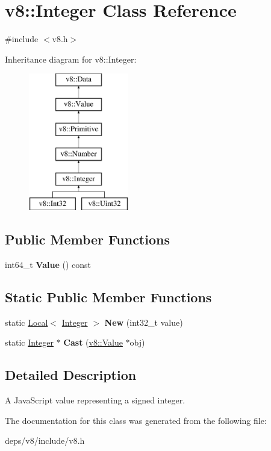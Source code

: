 \hypertarget{classv8_1_1_integer}{}\section{v8\+:\+:Integer Class Reference}
\label{classv8_1_1_integer}


{\ttfamily \#include $<$v8.\+h$>$}

Inheritance diagram for v8\+:\+:Integer\+:\begin{figure}[H]
\begin{center}
\leavevmode
\includegraphics[height=6.000000cm]{classv8_1_1_integer}
\end{center}
\end{figure}
\subsection*{Public Member Functions}
\begin{DoxyCompactItemize}
\item 
\hypertarget{classv8_1_1_integer_a93bcfb39090631a3ff95843463183c9c}{}int64\+\_\+t {\bfseries Value} () const \label{classv8_1_1_integer_a93bcfb39090631a3ff95843463183c9c}

\end{DoxyCompactItemize}
\subsection*{Static Public Member Functions}
\begin{DoxyCompactItemize}
\item 
\hypertarget{classv8_1_1_integer_a1099725f8f38584a6123ecf0e7a62592}{}static \hyperlink{classv8_1_1_local}{Local}$<$ \hyperlink{classv8_1_1_integer}{Integer} $>$ {\bfseries New} (int32\+\_\+t value)\label{classv8_1_1_integer_a1099725f8f38584a6123ecf0e7a62592}

\item 
\hypertarget{classv8_1_1_integer_a886f73d3d8bb91f8235f66d8dccec12a}{}static \hyperlink{classv8_1_1_integer}{Integer} $\ast$ {\bfseries Cast} (\hyperlink{classv8_1_1_value}{v8\+::\+Value} $\ast$obj)\label{classv8_1_1_integer_a886f73d3d8bb91f8235f66d8dccec12a}

\end{DoxyCompactItemize}


\subsection{Detailed Description}
A Java\+Script value representing a signed integer. 

The documentation for this class was generated from the following file\+:\begin{DoxyCompactItemize}
\item 
deps/v8/include/v8.\+h\end{DoxyCompactItemize}
